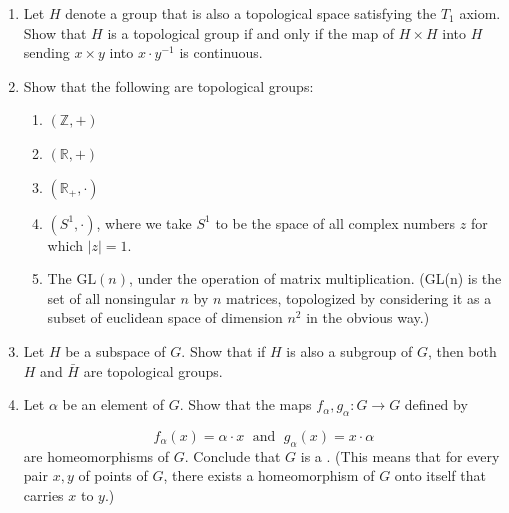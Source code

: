 \begin{enumerate}[itemsep=0.4em, parsep=0pt, topsep=0pt, partopsep=0pt, leftmargin=*, label=\arabic*., ref=\arabic*]
\item Let \(H\) denote a group that is also a topological space satisfying the \(T_{1}\) axiom. Show that \(H\) is a topological group if and only if the map of \(H \times H\) into \(H\) sending \(x \times y\) into \(x \cdot {y}^{-1}\) is continuous.

\item Show that the following are topological groups:
  \begin{enumerate}[itemsep=0.2em, parsep=0pt, topsep=0pt, partopsep=0pt, leftmargin=*, label=(\alph*), align=left]
  \item \(( {\mathbb{Z}, + })\)
  \item \(( {\mathbb{R}, + })\)
  \item \(( {\mathbb{R}_{ + }, \cdot })\)
  \item \(( {S^{1}, \cdot })\), where we take \(S^{1}\) to be the space of all complex numbers \(z\) for which \(| z| = 1\).
  \item The  \(\mathrm{{GL}}(n)\), under the operation of matrix multiplication. (GL(n) is the set of all nonsingular \(n\) by \(n\) matrices, topologized by considering it as a subset of euclidean space of dimension \(n^{2}\) in the obvious way.)
  \end{enumerate}

\item Let \(H\) be a subspace of \(G\). Show that if \(H\) is also a subgroup of \(G\), then both \(H\) and \(\bar{H}\) are topological groups.

\item Let \(\alpha\) be an element of \(G\). Show that the maps \(f_{\alpha },g_{\alpha } : G \rightarrow G\) defined by

\[
f_{\alpha }(x) = \alpha \cdot x\;\text{ and }\;g_{\alpha }(x) = x \cdot \alpha
\]
are homeomorphisms of \(G\). Conclude that \(G\) is a . (This means that for every pair \(x,y\) of points of \(G\), there exists a homeomorphism of \(G\) onto itself that carries \(x\) to \(y\).)


\end{enumerate}
